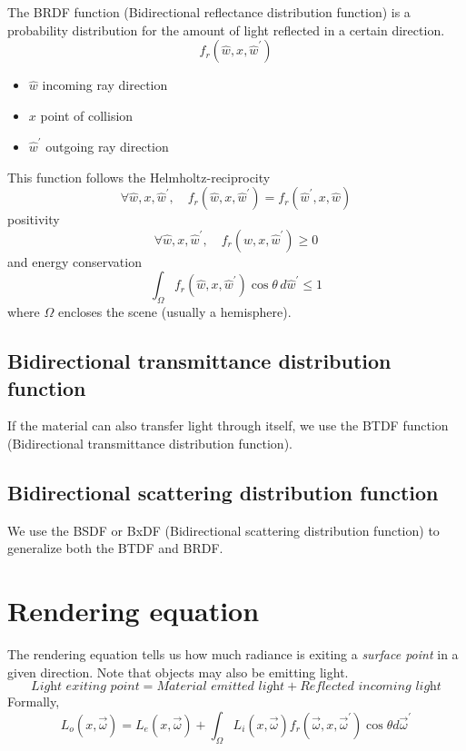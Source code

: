 \documentclass[a4paper]{article}
\begin{document}
The BRDF function (Bidirectional reflectance distribution function) is a probability distribution
for the amount of light reflected in a certain direction.
\[
    f_r(\hat{w}, x, \hat{w}^\prime)
\]

\begin{itemize}
    \item \(\hat{w}\) incoming ray direction
    \item \(x\) point of collision
    \item \(\hat{w}^\prime\) outgoing ray direction
\end{itemize}

This function follows the Helmholtz-reciprocity
\[
    \forall \hat{w},x,\hat{w}^\prime, \quad f_r(\hat{w}, x, \hat{w}^\prime) = f_r(\hat{w}^\prime, x, \hat{w})
\]
positivity
\[
    \forall \hat{w},x,\hat{w}^\prime, \quad f_r(\hat{w}, x, \hat{w}^\prime) \geq 0
\]
and energy conservation
\[
    \int_\Omega f_r(\hat{w}, x, \hat{w}^\prime) \cos \theta \, d\hat{w}^\prime \leq 1
\]
where \(\Omega\) encloses the scene (usually a hemisphere).

\subsection{Bidirectional transmittance distribution function}

If the material can also transfer light through itself, we use the BTDF function
(Bidirectional transmittance distribution function).

\subsection{Bidirectional scattering distribution function}

We use the BSDF or BxDF (Bidirectional scattering distribution function)
to generalize both the BTDF and BRDF.

\pagebreak

\section{Rendering equation}

The rendering equation tells us how much radiance is exiting a \textit{surface point}
in a given direction. Note that objects may also be emitting light.
\[
    \textit{Light exiting point} = \textit{Material emitted light} + \textit{Reflected incoming light}
\]
Formally,
\[
    L_o(x, \vec{\omega})
    =L_e(x, \vec{\omega})
    +\int_\Omega L_i(x,\vec{\omega})f_r(\vec{\omega}, x, \vec{\omega}^\prime)
    \cos \theta d\vec{\omega}^\prime
\]
\end{document}
